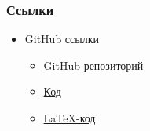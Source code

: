 \documentclass{beamer}
\begin{document}
\begin{frame}
\frametitle{Ссылки}
		\begin{itemize}
			\item {GitHub ссылки
			\begin{itemize}
			\item \href{https://github.com/Art232/-2022}{GitHub-репозиторий}
			\item \href{https://goo-gl.me/g9NWZ}{Код}
			\item \href{https://goo-gl.me/guvkc}{LaTeX-код}
			\end{itemize}}
		\end{itemize}
	\end{frame}
\end{document}
